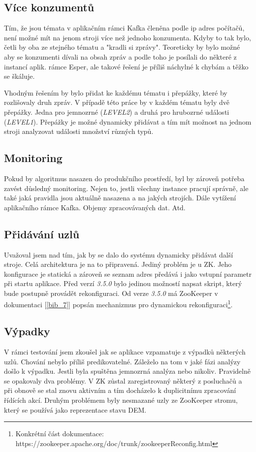 \documentclass[
  digital, %
  table,   %
  nolof,     %
  nolot,     %
  oneside, %
  nocover,
  monochrome,
  12pt
]{fithesis3}
\begin{document}
\subsection*{Více konzumentů}
Tím, že jsou témata v aplikačním rámci Kafka členěna podle ip adres počítačů, není možné mít na jenom stroji více než jednoho konzumenta. Kdyby to tak bylo, četli by oba ze stejného tématu a "kradli si zprávy". Teoreticky by bylo možné aby se konzumenti dívali na obsah zpráv a podle toho je posílali do některé z instancí aplik. rámce Esper, ale takové řešení je příliš náchylné k chybám a těžko se škáluje.

Vhodným řešením by bylo přidat ke každému tématu i přepážky, které by rozlišovaly druh zpráv. V případě této práce by v každém tématu byly dvě přepážky. Jedna pro jemnozrné (\textit{LEVEL2}) a druhá pro hrubozrné události (\textit{LEVEL1}). Přepážky je možné dynamicky přidávat a tím mít možnost na jednom stroji analyzovat události množství různých typů.

\subsection*{Monitoring}
Pokud by algoritmus nasazen do produkčního prostředí, byl by zároveň potřeba zavést  důsledný monitoring. Nejen to, jestli všechny instance pracují správně, ale také jaká pravidla jsou aktuálně nasazena a na jakých strojích. Dále vytížení aplikačního rámce Kafka. Objemy zpracovávaných dat. Atd.

\subsection*{Přidávání uzlů}
Uvažoval jsem nad tím, jak by se dalo do systému dynamicky přidávat další stroje. Celá architektura je na to připravená. Jediný problém je u ZK. Jeho konfigurace je statická a zároveň se seznam adres předává i jako vstupní parametr při startu aplikace. Před verzí \textit{3.5.0} bylo jedinou možností napsat skript, který bude postupně provádět rekonfiguraci. Od verze \textit{3.5.0} má ZooKeeper v dokumentaci [\ref{bib_7}] popsán mechanizmus pro dynamickou rekonfiguraci\footnote{Konkrétní část dokumentace: \\
https://zookeeper.apache.org/doc/trunk/zookeeperReconfig.html}.

\subsection*{Výpadky}
V rámci testování jsem zkoušel jak se aplikace vzpamatuje z výpadků některých uzlů. Chování nebylo příliš predikovatelné. Záleželo na tom v jaké fázi analýzy došlo k výpadku. Jestli byla spuštěna jemnozrná analýza nebo nikoliv. Pravidelně se opakovaly dva problémy. V ZK zůstal zaregistrovaný některý z posluchačů a při obnově se stal znovu aktivním a tím docházelo k duplicitnímu zpracování řídících akcí. Druhým problémem byly nesmazané uzly ze ZooKeeper stromu, který se používá jako reprezentace stavu DEM.
\end{document}
